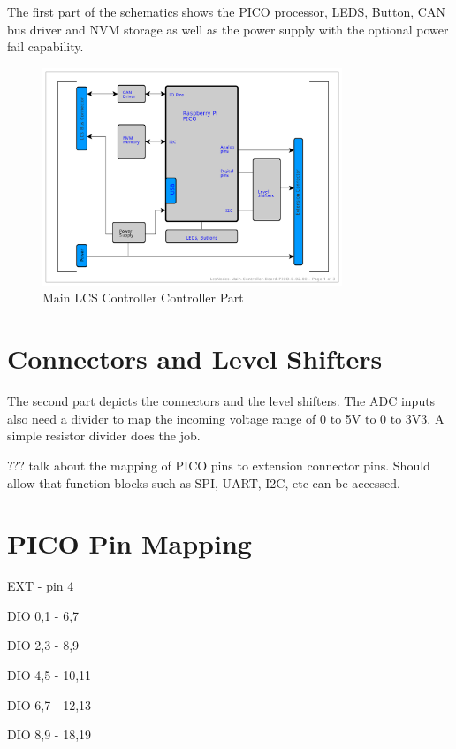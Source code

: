 The first part of the schematics shows the PICO processor, LEDS, Button, CAN bus driver and NVM storage as well as the power supply with the optional power fail capability.

\begin{figure}[htbp]
    \centering
    \includegraphics[page=2, width=0.8\textwidth]{./Schematics/Schematic_LcsNodes-Main-Controller-Board.pdf}
    \caption{Main LCS Controller Controller Part}
\end{figure}
\FloatBarrier

\section{Connectors and Level Shifters}

The second part depicts the connectors and the level shifters. The ADC inputs also need a divider to map the incoming voltage range of 0 to 5V to 0 to 3V3. A simple resistor divider does the job.


??? talk about the mapping of PICO pins to extension connector pins. Should allow that function blocks such as SPI, UART, I2C, etc can be accessed.

\section{PICO Pin Mapping}

EXT             - pin 4

DIO 0,1         - 6,7

DIO 2,3         - 8,9

DIO 4,5         - 10,11

DIO 6,7         - 12,13

DIO 8,9         - 18,19

